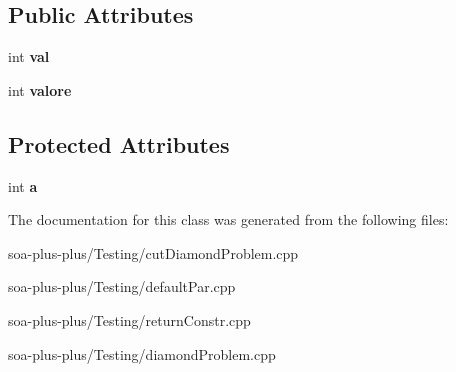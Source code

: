 \subsection*{Public Attributes}
\begin{DoxyCompactItemize}
\item 
\hypertarget{class_a_a3d102778a0f69cadff52b0ddf7be9b71}{
int {\bfseries val}}
\label{class_a_a3d102778a0f69cadff52b0ddf7be9b71}

\item 
\hypertarget{class_a_a78b467f77a6cd5f88c3fe4f37cdad2ed}{
int {\bfseries valore}}
\label{class_a_a78b467f77a6cd5f88c3fe4f37cdad2ed}

\end{DoxyCompactItemize}
\subsection*{Protected Attributes}
\begin{DoxyCompactItemize}
\item 
\hypertarget{class_a_a49a53415abd8f1b26235579cc805a15f}{
int {\bfseries a}}
\label{class_a_a49a53415abd8f1b26235579cc805a15f}

\end{DoxyCompactItemize}


The documentation for this class was generated from the following files:\begin{DoxyCompactItemize}
\item 
soa-\/plus-\/plus/Testing/cutDiamondProblem.cpp\item 
soa-\/plus-\/plus/Testing/defaultPar.cpp\item 
soa-\/plus-\/plus/Testing/returnConstr.cpp\item 
soa-\/plus-\/plus/Testing/diamondProblem.cpp\end{DoxyCompactItemize}
